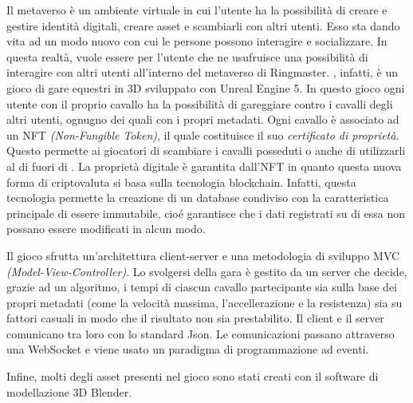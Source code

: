Il metaverso \`e un ambiente virtuale in cui l'utente ha la possibilità di creare e gestire identità digitali, creare asset e scambiarli con altri utenti. Esso sta dando vita ad un modo nuovo con cui le persone possono interagire e socializzare.
%
In questa realtà, \nomeapp{} vuole essere per l'utente che ne usufruisce una possibilità di interagire con altri utenti all'interno del metaverso di Ringmaster.
%
\nomeapp{}, infatti, \`e un gioco di gare equestri in 3D sviluppato con Unreal Engine 5.
%
In questo gioco ogni utente con il proprio cavallo ha la possibilità di gareggiare contro i cavalli degli altri utenti, ognugno dei quali con i propri metadati. 
%
Ogni cavallo \`e associato ad un NFT \textit{(Non-Fungible Token)}, il quale costituisce il suo \textit{certificato di proprietà}. Questo permette ai giocatori di scambiare i cavalli posseduti o anche di utilizzarli al di fuori di \nomeapp{}.
%
La proprietà digitale \`e garantita dall'NFT in quanto questa nuova forma di criptovaluta si basa sulla tecnologia blockchain. Infatti, questa tecnologia permette la creazione di un database condiviso con la caratteristica principale di essere immutabile, cio\'e garantisce che i dati registrati su di essa non possano essere modificati in alcun modo. 

Il gioco sfrutta un'architettura client-server e una metodologia di sviluppo MVC \textit{(Model-View-Controller)}. 
%
Lo svolgersi della gara \`e gestito da un server che decide, grazie ad un algoritmo, i tempi di ciascun cavallo partecipante sia sulla base dei propri metadati (come la velocità massima, l'accellerazione e la resistenza) sia su fattori casuali in modo che il risultato non sia prestabilito.
%
Il client e il server comunicano tra loro con lo standard Json. Le comunicazioni passano attraverso una WebSocket e viene usato un paradigma di programmazione ad eventi.

Infine, molti degli asset presenti nel gioco sono stati creati con il software di modellazione 3D Blender.